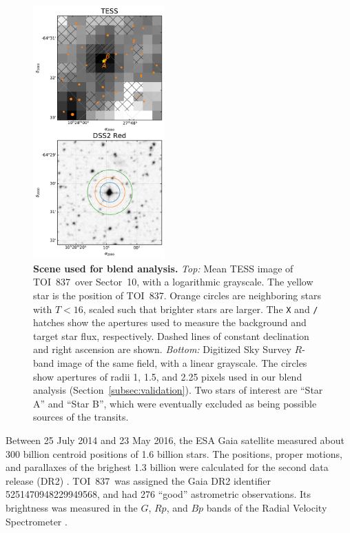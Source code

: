 \documentclass[12pt,twocolumn,tighten]{aastex62}
\newcommand{\tn}{TOI~837} %
\begin{document}
\begin{figure}[t]
	\begin{center}
		\leavevmode
		\includegraphics[width=0.45\textwidth]{f5.pdf}
	\end{center}
	\vspace{-0.7cm}
	\caption{ {\bf Scene used for blend analysis.}
    {\it Top:} Mean TESS image of \tn\ over Sector~10, with a
    logarithmic grayscale. The yellow star is the position of \tn.
    Orange circles are neighboring stars with $T<16$, scaled such that
    brighter stars are larger. The \texttt{X} and \texttt{/} hatches
    show the apertures used to measure the background and target star
    flux, respectively. Dashed lines of constant declination and right
    ascension are shown.  {\it Bottom:} Digitized Sky Survey $R$-band
    image of the same field, with a linear grayscale. The circles show
    apertures of radii 1, 1.5, and 2.25 pixels used in our blend
    analysis (Section~\ref{subsec:validation}).  Two stars of interest
    are ``Star A'' and ``Star B'', which were eventually excluded as
    being possible sources of the transits.
		\label{fig:scene}
	}
\end{figure}

Between 25 July 2014 and 23 May 2016, the ESA Gaia satellite measured
about 300 billion centroid positions of 1{.}6 billion stars.  The
positions, proper motions, and parallaxes of the brighest 1{.}3
billion were calculated for the second data release (DR2)
\citep{gaia_collaboration_gaia_2016,lindegren_gaiasoln_2018,gaia_collaboration_gaia_2018}.
\tn\ was assigned the Gaia DR2 identifier 5251470948229949568, and had
276 ``good'' astrometric observations. Its brightness was measured in
the $G$, $Rp$, and $Bp$ bands of the Radial Velocity Spectrometer
\citep{cropper_gaia_2018,evans_gaia_2018}.  
\end{document}
